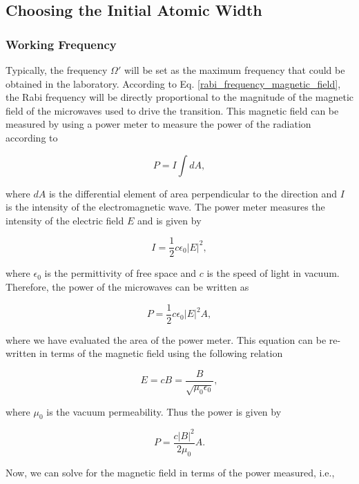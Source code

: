 \documentclass{article}
\begin{document}
\subsection{Choosing the Initial Atomic Width}
\subsubsection{Working Frequency}
Typically, the frequency $\Omega'$ will be set as the maximum frequency that could be obtained in the laboratory. According to Eq. \ref{rabi_frequency_magnetic_field}, the Rabi frequency will be directly proportional to the magnitude of the magnetic field of the microwaves used to drive the transition. This magnetic field can be measured by using a power meter to measure the power of the radiation according to

\begin{equation}
    P = I \int dA,
\end{equation}

where $dA$ is the differential element of area perpendicular to the direction and $I$ is the intensity of the electromagnetic wave. The power meter measures the intensity of the electric field $E$ and is given by

\begin{equation}
    I = \frac{1}{2} c \epsilon_{0} |E|^{2},
\end{equation}

where $\epsilon_{0}$ is the permittivity of free space and $c$ is the speed of light in vacuum. Therefore, the power of the microwaves can be written as

\begin{equation}
    P = \frac{1}{2} c \epsilon_{0} |E|^{2} A,
\end{equation}

where we have evaluated the area of the power meter. This equation can be re-written in terms of the magnetic field using the following relation

\begin{equation}
    E = c B = \frac{B}{\sqrt{\mu_{0} \epsilon_{0}}},
\end{equation}

where $\mu_{0}$ is the vacuum permeability. Thus the power is given by

\begin{equation}
    P = \frac{c |B|^{2}}{2 \mu_{0}} A.
\end{equation}

Now, we can solve for the magnetic field in terms of the power measured, i.e.,
\end{document}
